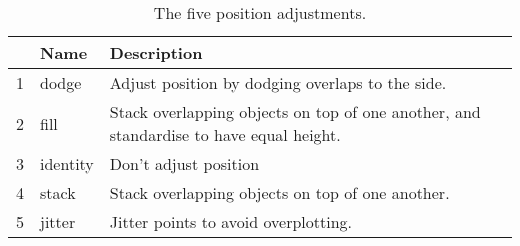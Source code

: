 \begin{table}[ht]
\centering
\begin{tabular}{rll}
  \hline
 & Name & Description \\ 
  \hline
1 & dodge & Adjust position by dodging overlaps to the side. \\ 
  2 & fill & Stack overlapping objects on top of one another, and standardise to have equal height. \\ 
  3 & identity & Don't adjust position \\ 
  4 & stack & Stack overlapping objects on top of one another. \\ 
  5 & jitter & Jitter points to avoid overplotting. \\ 
   \hline
\end{tabular}
\caption{The five position adjustments.} 
\label{position}
\end{table}
